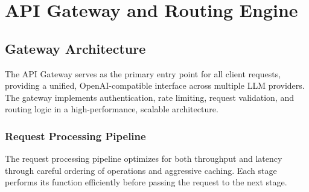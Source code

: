 \documentclass[12pt,a4paper,twoside]{report}
\begin{document}

\chapter{API Gateway and Routing Engine}

\section{Gateway Architecture}

The API Gateway serves as the primary entry point for all client requests, providing a unified, OpenAI-compatible interface across multiple LLM providers. The gateway implements authentication, rate limiting, request validation, and routing logic in a high-performance, scalable architecture.

\subsection{Request Processing Pipeline}

The request processing pipeline optimizes for both throughput and latency through careful ordering of operations and aggressive caching. Each stage performs its function efficiently before passing the request to the next stage.
\end{document}
